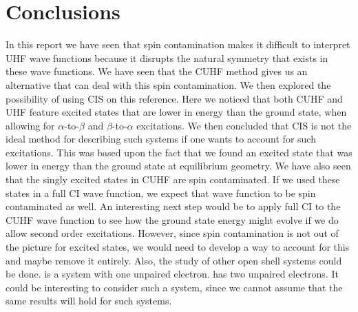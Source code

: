 \documentclass[twoside,twocolumn,9pt]{article}
\renewcommand{\refname}{Notes and references}
\begin{document}
\section{Conclusions}
In this report we have seen that spin contamination makes it difficult to interpret UHF wave functions because it disrupts the natural symmetry that exists in these wave functions.
We have seen that the CUHF method gives us an alternative that can deal with this spin contamination. We then explored the possibility of using CIS on this reference. Here we
noticed that both CUHF and UHF feature excited states that are lower in energy than the ground state, when allowing for $\alpha$-to-$\beta$ and $\beta$-to-$\alpha$ excitations. 
We then concluded that CIS is not the ideal method for describing such systems if one wants to account for such excitations. This was based upon the fact that we found an excited 
state that was lower in energy than the ground state at equilibrium geometry. We have also seen that the singly excited states in CUHF are spin contaminated. If we used these
states in a full CI wave function, we expect that wave function to be spin contaminated as well.
An interesting next step would be to apply full CI to the CUHF wave function to see how the ground state energy might evolve if we do allow second order excitations. However, since
spin contamination is not out of the picture for excited states, we would need to develop a way to account for this and maybe remove it entirely. Also, the
study of other open shell systems could be done.  is a system with one unpaired electron.  has two unpaired electrons. It could be interesting to consider such a system,
since we cannot assume that the same results will hold for such systems.






\balance


\end{document}
